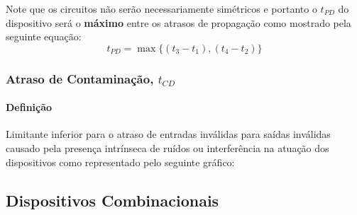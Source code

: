 \documentclass{article}
\begin{document}
            Note que os circuitos não serão necessariamente simétricos e portanto o $t_{PD}$ do dispositivo será o \textbf{máximo} entre os atrasos de propagação como mostrado pela seguinte equação:
                \begin{equation}
                    \boxed{
                        t_{PD} = \max\{ (t_{3} - t_{1}), (t_{4} - t_{2}) \}
                    }
                \end{equation}

        \subsubsection{Atraso de Contaminação, $t_{CD}$}
            \paragraph{Definição}Limitante inferior para o atraso de entradas inválidas para saídas inválidas causado pela presença intrínseca de ruídos ou interferência na atuação dos dispositivos como representado pelo seguinte gráfico:

        \subsection{Dispositivos Combinacionais}
\end{document}
